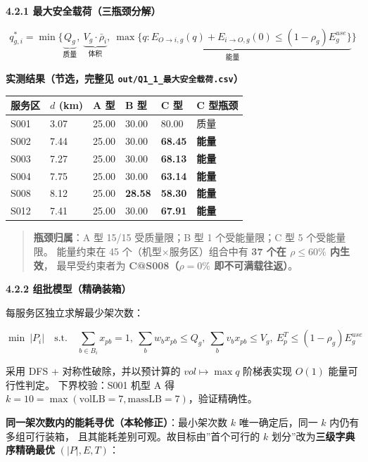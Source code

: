 \documentclass[
  10.5pt,
]{extarticle}
\newcounter{none} %
\begin{document}
\textbf{4.2.1 最大安全载荷（三瓶颈分解）}

\[q^{*}_{g,i}=\min\Big\{\underbrace{Q_g}_{\text{质量}},\ \underbrace{V_g\cdot\bar\rho_{i}}_{\text{体积}},\ \underbrace{\max\{q: E_{O\to i,g}(q)+E_{i\to O,g}(0)\le(1-\rho_g)E^{use}_g\}}_{\text{能量}}\Big\}\]

\textbf{实测结果（节选，完整见 \texttt{out/Q1\_1\_最大安全载荷.csv}）}

{\def\LTcaptype{none} %
\begin{longtable}[]{@{}llllll@{}}
\toprule\noalign{}
服务区 & \(d\) (km) & A 型 & B 型 & C 型 & C 型瓶颈 \\
\midrule\noalign{}
\endhead
\bottomrule\noalign{}
\endlastfoot
S001 & 3.07 & 25.00 & 30.00 & 80.00 & 质量 \\
S002 & 7.44 & 25.00 & 30.00 & \textbf{68.45} & \textbf{能量} \\
S003 & 7.27 & 25.00 & 30.00 & \textbf{68.13} & \textbf{能量} \\
S004 & 7.75 & 25.00 & 30.00 & \textbf{63.14} & \textbf{能量} \\
S008 & 8.12 & 25.00 & \textbf{28.58} & \textbf{58.30} & \textbf{能量} \\
S012 & 7.41 & 25.00 & 30.00 & \textbf{67.91} & \textbf{能量} \\
\end{longtable}
}

\begin{quote}
\textbf{瓶颈归属}：A 型 15/15 受质量限；B 型 1 个受能量限；C 型 5
个受能量限。 能量约束在 45 个（机型×服务区）组合中有 \textbf{37 个在
\(\rho\le60\%\) 内生效}， 最早受约束者为 \textbf{C@S008（\(\rho=0\%\)
即不可满载往返）}。
\end{quote}

\textbf{4.2.2 组批模型（精确装箱）}

每服务区独立求解最少架次数：

\[\min\ \lvert P_i\rvert \quad \text{s.t.}\quad
\sum_{b\in B_i}x_{pb}=1,\ \sum_b w_b x_{pb}\le Q_g,\ \sum_b v_b x_{pb}\le V_g,\ E^T_p\le(1-\rho_g)E^{use}_g\]

采用 DFS + 对称性破除，并以预计算的 \(vol\mapsto\max q\) 阶梯表实现
\(O(1)\) 能量可行性判定。 下界校验：S001 机型 A 得
\(k=10=\max(\text{volLB}=7,\text{massLB}=7)\)，验证精确性。

\textbf{同一架次数内的能耗寻优（本轮修正）}：最小架次数 \(k\)
唯一确定后，同一 \(k\) 内仍有多组可行装箱，
且其能耗差别可观。故目标由''首个可行的 \(k\)
划分''改为\textbf{三级字典序精确最优} \((\lvert P\rvert,E,T)\)：
\end{document}
